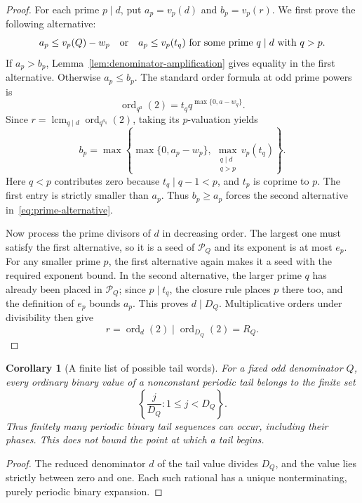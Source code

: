 \documentclass[11pt]{article}
\newtheorem{corollary}[theorem]{Corollary}
\theoremstyle{definition}
\theoremstyle{remark}
\begin{document}
\begin{proof}
For each prime $p\mid d$, put $a_p=v_p(d)$ and $b_p=v_p(r)$. We first prove the following alternative:
\begin{equation}\label{eq:prime-alternative}
 a_p\le v_p(Q)-w_p
 \quad\hbox{or}\quad
 a_p\le v_p(t_q)\text{ for some prime }q\mid d\text{ with }q>p.
\end{equation}
If $a_p>b_p$, Lemma~\ref{lem:denominator-amplification} gives equality in the first alternative. Otherwise $a_p\le b_p$. The standard order formula at odd prime powers is
\[
 \operatorname{ord}_{q^a}(2)
   =t_q q^{\max\{0,a-w_q\}}.
\]
Since $r=\operatorname{lcm}_{q\mid d}\operatorname{ord}_{q^{a_q}}(2)$, taking its $p$-valuation yields
\[
 b_p=\max\left\{\max\{0,a_p-w_p\},\
                \max_{\substack{q\mid d\\q>p}}v_p(t_q)\right\}.
\]
Here $q<p$ contributes zero because $t_q\mid q-1<p$, and $t_p$ is coprime to $p$. The first entry is strictly smaller than $a_p$. Thus $b_p\ge a_p$ forces the second alternative in~\eqref{eq:prime-alternative}.

Now process the prime divisors of $d$ in decreasing order. The largest one must satisfy the first alternative, so it is a seed of $\mathcal P_Q$ and its exponent is at most $e_p$. For any smaller prime $p$, the first alternative again makes it a seed with the required exponent bound. In the second alternative, the larger prime $q$ has already been placed in $\mathcal P_Q$; since $p\mid t_q$, the closure rule places $p$ there too, and the definition of $e_p$ bounds $a_p$. This proves $d\mid D_Q$. Multiplicative orders under divisibility then give
\[
 r=\operatorname{ord}_d(2)\mid\operatorname{ord}_{D_Q}(2)=R_Q.
\]
\end{proof}

\begin{corollary}[A finite list of possible tail words]\label{cor:finite-tail-alphabet}
For a fixed odd denominator $Q$, every ordinary binary value of a nonconstant periodic tail belongs to the finite set
\[
 \left\{\frac{j}{D_Q}:1\le j<D_Q\right\}.
\]
Thus finitely many periodic binary tail sequences can occur, including their phases. This does not bound the point at which a tail begins.
\end{corollary}

\begin{proof}
The reduced denominator $d$ of the tail value divides $D_Q$, and the value lies strictly between zero and one. Each such rational has a unique nonterminating, purely periodic binary expansion.
\end{proof}
\end{document}
